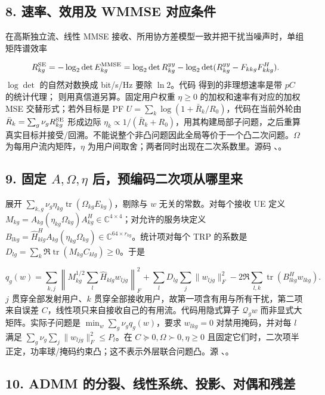 \documentclass[11pt,a4paper]{ctexart}
\begin{document}
\subsection*{8. 速率、效用及 WMMSE 对应条件}

在高斯独立流、线性 MMSE 接收、所用协方差模型一致并把干扰当噪声时，单组矩阵谱效率\par
\[
R^{\rm SE}_{kg}=-\log_2\det E^{\rm MMSE}_{kg}
=\log_2\det R^{yy}_{kg}-\log_2\det(R^{yy}_{kg}-F_{kkg}F_{kkg}^H).
\]
$\log\det$ 的自然对数换成 bit/s/Hz 要除 $\ln2$。代码  得到的非理想速率是带 $pC$ 的统计代理； 则用真信道另算。固定用户权重 $\eta\ge0$ 的加权和速率有对应的加权 MSE 交替形式；若外目标是 PF $U=\sum_k\log(1+\bar R_k/R_0)$，代码在当前外轮由 $\bar R_k=\sum_g\nu_gR^{\rm SE}_{kg}$ 形成边际 $\eta_k\propto1/(\bar R_k+R_0)$，用其构建局部子问题，之后重算真实目标并接受/回溯。不能说整个非凸问题因此全局等价于一个凸二次问题。$\Omega$ 为每用户流内矩阵，$\eta$ 为用户间取舍；两者同时出现在二次系数里。源码 、。\par

\subsection*{9. 固定 $A,\Omega,\eta$ 后，预编码二次项从哪里来}

展开 $\sum_{k,g}\nu_g\eta_{kg}\operatorname{tr}(\Omega_{kg}E_{kg})$，剔除与 $w$ 无关的常数。对每个接收 UE 定义 $M_{kg}=A_{kg}(\eta_{kg}\Omega_{kg})A_{kg}^H\in\mathbb C^{4\times4}$；对允许的服务块定义 $B_{lkg}=\widehat H_{klg}^HA_{kg}(\eta_{kg}\Omega_{kg})\in\mathbb C^{64\times r_{kg}}$。统计项对每个 TRP 的系数是 $D_{lg}=\sum_k\Re\operatorname{tr}(M_{kg}C_{klg})\ge0$。于是\par
\[
q_g(w)=\sum_{k,j}\left\|M_{kg}^{1/2}\sum_l\widehat H_{klg}w_{ljg}\right\|_F^2
+\sum_lD_{lg}\sum_j\|w_{ljg}\|_F^2
-2\Re\sum_{l,k}\operatorname{tr}(B_{lkg}^Hw_{lkg}).
\]
$j$ 贯穿全部发射用户、$k$ 贯穿全部接收用户，故第一项含有用与所有干扰，第二项来自误差 $C$，线性项只来自接收自己的有用流。代码用隐式算子 $\mathcal Q_gw$ 而非显式大矩阵。实际子问题是 $\min_w\sum_g\nu_gq_g(w)$，要求 $w_{lkg}=0$ 对禁用掩码，并对每 $l$ 满足 $\sum_g\nu_g\sum_j\|w_{ljg}\|_F^2\le P_l$。在 $C\succeq0,\Omega\succ0,\eta\ge0$ 且固定它们时，二次项半正定，功率球/掩码约束凸；这不表示外层联合问题凸。源 、。\par

\subsection*{10. ADMM 的分裂、线性系统、投影、对偶和残差}
\end{document}

